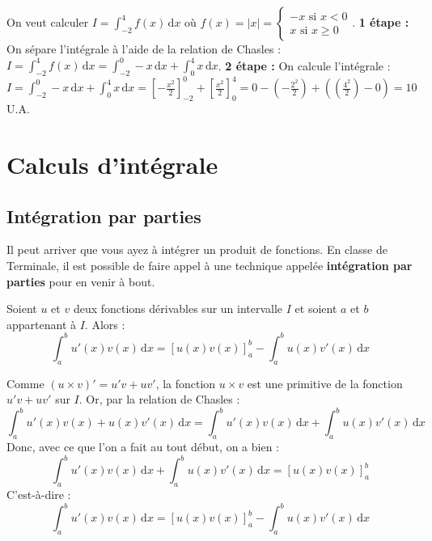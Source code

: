 	\begin{tip}[Exemple]
		On veut calculer $I = \int_{-2}^4 f(x) \, \mathrm{d}x$ où $f(x) = |x| = \begin{cases} -x \text{ si } x < 0 \\ x \text{ si } x \geq 0 \end{cases}$.
		\newpar
		\textbf{1\iere{} étape :} On sépare l'intégrale à l'aide de la relation de Chasles :
		\newpar
		$I = \int_{-2}^{4} f(x) \, \mathrm{d}x = \int_{-2}^{0} -x \, \mathrm{d}x + \int_{0}^{4} x \, \mathrm{d}x$.
		\newpar
		\textbf{2\ieme{} étape :} On calcule l'intégrale :
		\newpar
		$I = \int_{-2}^{0} -x \, \mathrm{d}x + \int_{0}^{4} x \, \mathrm{d}x = \left[ -\frac{x^2}{2} \right]_{-2}^0 + \left[ \frac{x^2}{2} \right]_0^4 = 0 - (-\frac{2^2}{2}) + ((\frac{4^2}{2}) - 0) = 10$ U.A.
	\end{tip}

	\section{Calculs d'intégrale}

	\subsection{Intégration par parties}

	Il peut arriver que vous ayez à intégrer un produit de fonctions. En classe de Terminale, il est possible de faire appel à une technique appelée \textbf{intégration par parties} pour en venir à bout.

	\begin{formula}
		Soient $u$ et $v$ deux fonctions dérivables sur un intervalle $I$ et soient $a$ et $b$ appartenant à $I$. Alors :
		\[ \int_a^b u'(x) v(x) \, \mathrm{d}x = \left[u(x) v(x)\right]_a^b - \int_a^b u(x) v'(x) \, \mathrm{d}x \]
	\end{formula}

	\begin{demonstration}
		Comme $(u \times v)' = u'v + uv'$, la fonction $u \times v$ est une primitive de la fonction $u'v + uv'$ sur $I$. Or, par la relation de Chasles :
		\[ \int_a^b u'(x) v(x) + u(x) v'(x) \, \mathrm{d}x = \int_a^b u'(x) v(x) \, \mathrm{d}x + \int_a^b u(x) v'(x) \, \mathrm{d}x \]
		Donc, avec ce que l'on a fait au tout début, on a bien :
		\[ \int_a^b u'(x) v(x) \, \mathrm{d}x + \int_a^b u(x) v'(x) \, \mathrm{d}x = \left[u(x) v(x)\right]_a^b \]
		C'est-à-dire :
		\[ \int_a^b u'(x) v(x) \, \mathrm{d}x = \left[u(x) v(x)\right]_a^b - \int_a^b u(x) v'(x) \, \mathrm{d}x \]
	\end{demonstration}

